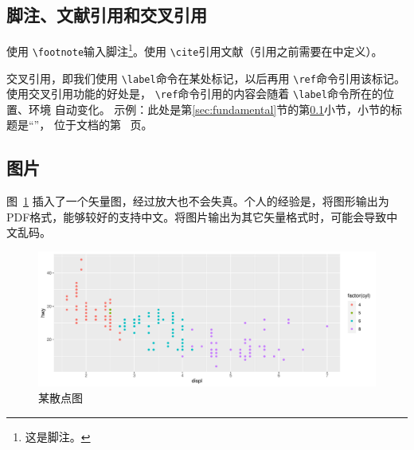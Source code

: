 \documentclass[zihao = -4, linespread = 1.5]{ctexart} %
\begin{document}
\subsection{脚注、文献引用和交叉引用}\label{subsec:crossRef}
使用 \texttt{\textbackslash footnote}输入脚注\footnote{这是脚注。 }。使用 \texttt{\textbackslash cite}引用文献\cite{PangQingShan}（引用之前需要在中定义）。

交叉引用，即我们使用 \texttt{\textbackslash label}命令在某处标记，以后再用 \texttt{\textbackslash ref}命令引用该标记。
使用交叉引用功能的好处是， \texttt{\textbackslash ref}命令引用的内容会随着 \texttt{\textbackslash label}命令所在的位置、环境
自动变化。
示例：此处是第\ref{sec:fundamental}节的第\ref{subsec:crossRef}小节，小节的标题是“”，
位于文档的第~\pageref{subsec:crossRef} 页。%



\subsection{图片}
图~\ref{fig:scatter} 插入了一个矢量图，经过放大也不会失真。个人的经验是，将图形输出为PDF格式，能够较好的支持中文。将图片输出为其它矢量格式时，可能会导致中文乱码。
\begin{figure}[htpb]
  \centering
  \includegraphics[width=\textwidth]{picture/scatter.pdf}
  \caption{某散点图  \protect\footnotemark} %
  \label{fig:scatter}
\end{figure}
\end{document}
